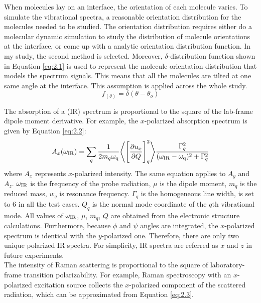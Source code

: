 When molecules lay on an interface, the orientation of each molecule varies. To simulate the vibrational spectra, a reasonable orientation distribution for the molecules needed to be studied. The orientation distribution requires either do a molecular dynamic simulation to study the distribution of molecule orientations at the interface, or come up with a analytic orientation distribution function. In my study, the second method is selected. Moreover, $\delta$-distribution function shown in Equation \ref{eq:2.1} is used to represent the molecule orientation distribution that models the spectrum signals. This means that all the molecules are tilted at one same angle at the interface. This assumption is applied across the whole study. \\

\begin{equation} \label{eq:2.1}
f_{(\theta)} = \delta(\theta - \theta_{o})
\end{equation} 

The absorption of a (IR) spectrum is proportional to the square of the lab-frame dipole moment derivative. For example, the $x$-polarized absorption spectrum is given by Equation \ref{eq:2.2}: \\

\begin{equation} \label{eq:2.2}
A_x(\omega_{\rm IR}) = \sum_{q} \frac{1}{2 m_{q} \omega_{\rm q}} \Bigg \langle \Bigg\lbrack \frac{\partial u_x}{\partial Q} \Bigg\rbrack_{q} ^2 \Bigg\rangle \frac{\Gamma_q^2}{(\omega_{\rm IR}-\omega_{\rm q})^2 + \Gamma_q^2}
\end{equation} 
where $A_x$ represents $x$-polarized intensity. The same equation applies to $A_y$ and $A_z$. $\omega_{\rm IR}$ is the frequency of the probe radiation, $\mu$ is the dipole moment, $m_q$ is the reduced mass, $w_q$ is resonance frequency. $\Gamma_q$ is the homogeneous line width, is set to $6$ in all the test cases. $Q_q$ is the normal mode coordinate of the $q$th vibrational mode. All values of $\omega_{\rm IR}$, $\mu$, $m_q$, $Q$ are obtained from the electronic structure calculations. Furthermore, because $\phi$ and $\psi$ angles are integrated, the $x$-polarized spectrum is identical with the $y$-polarized one. Therefore, there are only two unique polarized IR spectra. For simplicity, IR spectra are referred as $x$ and $z$ in future experiments. \\

The intensity of Raman scattering is proportional to the square of laboratory-frame transition polarizability. For example, Raman spectroscopy with an $x$-polarized excitation source collects the $x$-polarized component of the scattered radiation, which can be approximated from Equation \ref{eq:2.3}. \\

